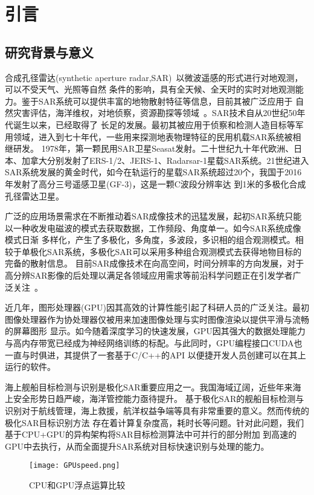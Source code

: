 \chapter{引言}
\label{cha:intro}

\section{研究背景与意义}
合成孔径雷达(synthetic aperture radar,SAR)~\cite{Knight2018Synthetic}以微波遥感的形式进行对地观测，可以不受天气、光照等自然
条件的影响，具有全天候、全天时的实时对地观测能力。鉴于SAR系统可以提供丰富的地物散射特征等信息，目前其被广泛应用于
自然灾害评估，海洋维权，对地侦察，资源勘探等领域~\cite{Moreira2013A}。SAR技术自从20世纪50年代诞生以来，已经取得了
长足的发展。最初其被应用于侦察和检测人造目标等军用领域，进入到七十年代，一些用来探测地表物理特征的民用机载SAR系统被相继研发。
1978年，第一颗民用SAR卫星Seasat发射。二十世纪九十年代欧洲、日本、加拿大分别发射了ERS-1/2、JERS-1、Radarsar-1星载SAR系统。21世纪进入
SAR系统发展的黄金时代，如今在轨运行的星载SAR系统超过20个，我国于2016年发射了高分三号遥感卫星(GF-3)，这是一颗C波段分辨率达
到1米的多极化合成孔径雷达卫星。

广泛的应用场景需求在不断推动着SAR成像技术的迅猛发展，起初SAR系统只能以一种收发电磁波的模式去获取数据，工作频段、角度单一。如今SAR系统成像模式日渐
多样化，产生了多极化，多角度，多波段，多识相的组合观测模式。相较于单极化SAR系统，多极化SAR可以采用多种组合观测模式去获得地物目标的完备的散射信息。
目前SAR成像技术在向高空间，时间分辨率的方向发展，对于高分辨SAR影像的后处理以满足各领域应用需求等前沿科学问题正在引发学者广泛关注~\cite{李德仁2012高分辨率对地观测的若干前沿科学问题}。

近几年，图形处理器(GPU)因其高效的计算性能引起了科研人员的广泛关注。最初图像处理器作为协处理器仅被用来加速图像处理与实时图像渲染以提供平滑与流畅的屏幕图形
显示。如今随着深度学习的快速发展，GPU因其强大的数据处理能力与高内存带宽已经成为神经网络训练的标配。与此同时，GPU编程接口CUDA也一直与时俱进，其提供了一套基于C/C++的API
以便捷开发人员创建可以在其上运行的软件。

海上舰船目标检测与识别是极化SAR重要应用之一。我国海域辽阔，近些年来海上安全形势日趋严峻，海洋管控能力亟待提升。
基于极化SAR的舰船目标检测与识别对于航线管理，海上救援，航洋权益争端等具有非常重要的意义。然而传统的极化SAR目标识别方法
存在着计算复杂度高，耗时长等问题。针对此问题，我们基于CPU+GPU的异构架构将SAR目标检测算法中可并行的部分附加
到高速的GPU中去执行，从而全面提升SAR系统对目标快速识别与处理的能力。

  \begin{figure}[H] %
    \centering
    \texttt{[image: GPUspeed.png]}
    \caption{CPU和GPU浮点运算比较}
    \label{fig:chap1:GPUspeed}
  \end{figure}

